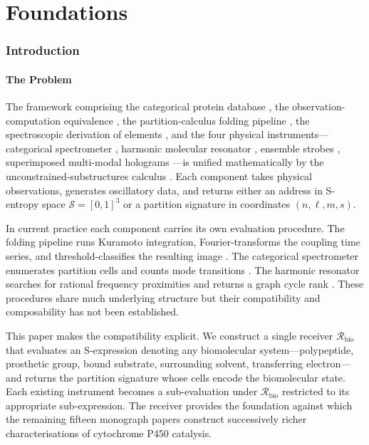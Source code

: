 \documentclass[11pt,twocolumn,a4paper]{article}
\theoremstyle{definition}
\theoremstyle{remark}
\newcommand{\Sspace}{\mathcal{S}}
\newcommand{\Recv}{\mathcal{R}}
\begin{document}
\part{Foundations}

\section{Introduction}
\label{sec:introduction}

\subsection{The Problem}

The framework comprising the categorical protein database \citep{sachikonye2025c}, the observation-computation equivalence \citep{sachikonye2025occ}, the partition-calculus folding pipeline \citep{sachikonye2025fold}, the spectroscopic derivation of elements \citep{sachikonye2025spec}, and the four physical instruments---categorical spectrometer \citep{sachikonye2025_hyperfine}, harmonic molecular resonator \citep{sachikonye2025_hmr}, ensemble strobes \citep{sachikonye2025_strobes}, superimposed multi-modal holograms \citep{sachikonye2025_holo}---is unified mathematically by the unconstrained-substructures calculus \citep{sachikonye2025unc}. Each component takes physical observations, generates oscillatory data, and returns either an address in S-entropy space $\Sspace = [0,1]^3$ or a partition signature in coordinates $(n, \ell, m, s)$.

In current practice each component carries its own evaluation procedure. The folding pipeline runs Kuramoto integration, Fourier-transforms the coupling time series, and threshold-classifies the resulting image \citep{sachikonye2025fold}. The categorical spectrometer enumerates partition cells and counts mode transitions \citep{sachikonye2025_hyperfine}. The harmonic resonator searches for rational frequency proximities and returns a graph cycle rank \citep{sachikonye2025_hmr}. These procedures share much underlying structure but their compatibility and composability has not been established.

This paper makes the compatibility explicit. We construct a single receiver $\Recv_{\mathrm{bio}}$ that evaluates an S-expression denoting any biomolecular system---polypeptide, prosthetic group, bound substrate, surrounding solvent, transferring electron---and returns the partition signature whose cells encode the biomolecular state. Each existing instrument becomes a sub-evaluation under $\Recv_{\mathrm{bio}}$ restricted to its appropriate sub-expression. The receiver provides the foundation against which the remaining fifteen monograph papers \citep{sachikonye2025_p450monograph} construct successively richer characterisations of cytochrome P450 catalysis.
\end{document}
